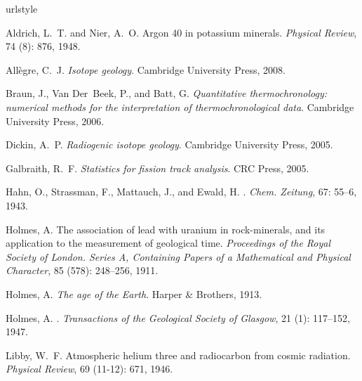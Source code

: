 \documentclass{book}
\begin{document}
\begin{thebibliography}{16}
\providecommand{\natexlab}[1]{#1}
\providecommand{\url}[1]{\texttt{#1}}
\expandafter\ifx\csname urlstyle\endcsname\relax
  \providecommand{\doi}[1]{doi: #1}\else
  \providecommand{\doi}{doi: \begingroup \urlstyle{rm}\Url}\fi

Aldrich, L.~T. and Nier, A.~O.
\newblock Argon 40 in potassium minerals.
\newblock \emph{Physical Review}, 74 (8): 876, 1948.

All{\`e}gre, C.~J.
\newblock \emph{Isotope geology}.
\newblock Cambridge University Press, 2008.

Braun, J., Van Der~Beek, P., and Batt, G.
\newblock \emph{Quantitative thermochronology: numerical methods for the
  interpretation of thermochronological data}.
\newblock Cambridge University Press, 2006.

Dickin, A.~P.
\newblock \emph{Radiogenic isotope geology}.
\newblock Cambridge University Press, 2005.

Galbraith, R.~F.
\newblock \emph{Statistics for fission track analysis}.
\newblock CRC Press, 2005.

Hahn, O., Strassman, F., Mattauch, J., and Ewald, H.
.
\newblock \emph{Chem. Zeitung}, 67: 55--6, 1943.

Holmes, A.
\newblock The association of lead with uranium in rock-minerals, and its
  application to the measurement of geological time.
\newblock \emph{Proceedings of the Royal Society of London. Series A,
  Containing Papers of a Mathematical and Physical Character}, 85
  (578): 248--256, 1911.

Holmes, A.
\newblock \emph{The age of the Earth}.
\newblock Harper \& Brothers, 1913.

Holmes, A.
.
\newblock \emph{Transactions of the Geological Society of Glasgow}, 21
  (1): 117--152, 1947.

Libby, W.~F.
\newblock Atmospheric helium three and radiocarbon from cosmic radiation.
\newblock \emph{Physical Review}, 69 (11-12): 671, 1946.


\end{thebibliography}
\end{document}
